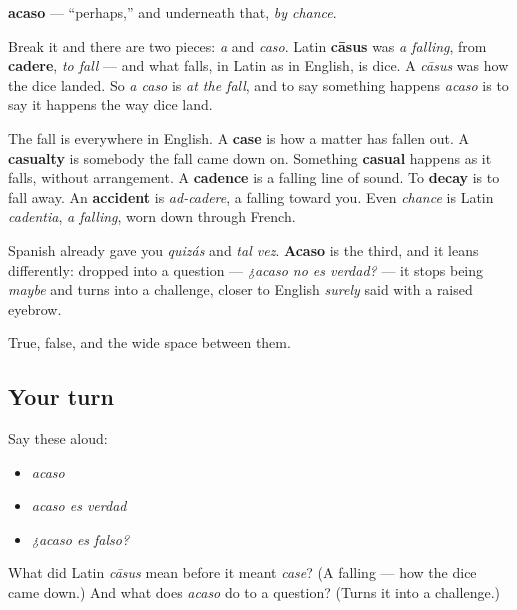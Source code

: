 \begin{cousinweb}
\textbf{acaso} — \textquotedblleft{}perhaps,\textquotedblright{} and underneath that, \emph{by chance}.

Break it and there are two pieces: \emph{a} and \emph{caso}. Latin \textbf{cāsus} was \emph{a falling}, from \textbf{cadere}, \emph{to fall} — and what falls, in Latin as in English, is dice. A \emph{cāsus} was how the dice landed. So \emph{a caso} is \emph{at the fall}, and to say something happens \emph{acaso} is to say it happens the way dice land.

The fall is everywhere in English. A \textbf{case} is how a matter has fallen out. A \textbf{casualty} is somebody the fall came down on. Something \textbf{casual} happens as it falls, without arrangement. A \textbf{cadence} is a falling line of sound. To \textbf{decay} is to fall away. An \textbf{accident} is \emph{ad-cadere}, a falling toward you. Even \emph{chance} is Latin \emph{cadentia}, \emph{a falling}, worn down through French.

Spanish already gave you \emph{quizás} and \emph{tal vez}. \textbf{Acaso} is the third, and it leans differently: dropped into a question — \emph{¿acaso no es verdad?} — it stops being \emph{maybe} and turns into a challenge, closer to English \emph{surely} said with a raised eyebrow.
\end{cousinweb}

\begin{grammarlens}[title={What you've built}]
True, false, and the wide space between them.
\end{grammarlens}

\subsection*{Your turn}
Say these aloud:

\begin{itemize}
\raggedright
  \item \emph{acaso}
  \item \emph{acaso es verdad}
  \item \emph{¿acaso es falso?}
\end{itemize}

\begin{tcolorbox}[breakable,colback=teal!4,colframe=teal!35!black,title={Before you move on}]
What did Latin \emph{cāsus} mean before it meant \emph{case}? (A falling — how the dice came down.) And what does \emph{acaso} do to a question? (Turns it into a challenge.)
\end{tcolorbox}
